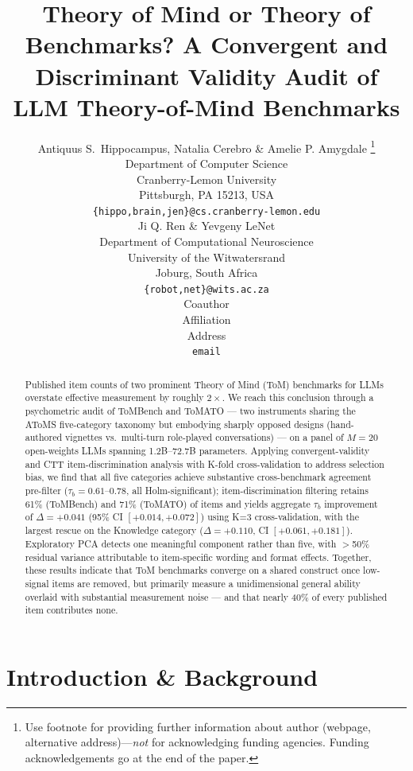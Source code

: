 \documentclass{article} %
\title{Theory of Mind or Theory of Benchmarks? A Convergent and Discriminant Validity Audit of LLM Theory-of-Mind Benchmarks}
\author{Antiquus S.~Hippocampus, Natalia Cerebro \& Amelie P. Amygdale \thanks{ Use footnote for providing further information
about author (webpage, alternative address)---\emph{not} for acknowledging
funding agencies.  Funding acknowledgements go at the end of the paper.} \\
Department of Computer Science\\
Cranberry-Lemon University\\
Pittsburgh, PA 15213, USA \\
\texttt{\{hippo,brain,jen\}@cs.cranberry-lemon.edu} \\
\And
Ji Q. Ren \& Yevgeny LeNet \\
Department of Computational Neuroscience \\
University of the Witwatersrand \\
Joburg, South Africa \\
\texttt{\{robot,net\}@wits.ac.za} \\
\AND
Coauthor \\
Affiliation \\
Address \\
\texttt{email}
}
\begin{document}
\ifcolmsubmission
\linenumbers
\fi

\maketitle


\begin{abstract}
Published item counts of two prominent Theory of Mind (ToM) benchmarks
for LLMs overstate effective measurement by roughly $2\times$.
We reach this conclusion through a psychometric audit of
ToMBench \citep{chen2024tombench} and ToMATO \citep{shinoda2025tomato}
--- two instruments sharing the AToMS five-category taxonomy
\citep{beaudoin2020atoms} but embodying sharply opposed designs
(hand-authored vignettes vs.\ multi-turn role-played conversations)
--- on a panel of $M{=}20$ open-weights LLMs spanning 1.2B--72.7B
parameters.
Applying convergent-validity and CTT item-discrimination analysis with
K-fold cross-validation to address selection bias,
we find that all five categories achieve substantive cross-benchmark
agreement pre-filter ($\tau_b = 0.61$--$0.78$, all Holm-significant);
item-discrimination filtering retains 61\% (ToMBench) and 71\% (ToMATO) of items and yields
aggregate $\tau_b$ improvement of $\Delta{=}{+}0.041$
(95\% CI $[{+}0.014,{+}0.072]$) using K=3 cross-validation,
with the largest rescue on the Knowledge category
($\Delta{=}{+}0.110$, CI $[{+}0.061,{+}0.181]$).
Exploratory PCA detects one meaningful component rather than five,
with $>$50\% residual variance attributable to item-specific wording
and format effects.
Together, these results indicate that ToM benchmarks converge on a
shared construct once low-signal items are removed, but primarily
measure a unidimensional general ability overlaid with substantial
measurement noise --- and that nearly 40\% of every published item
contributes none.
\end{abstract}


\section{Introduction \& Background}
\label{sec:intro}
\end{document}
